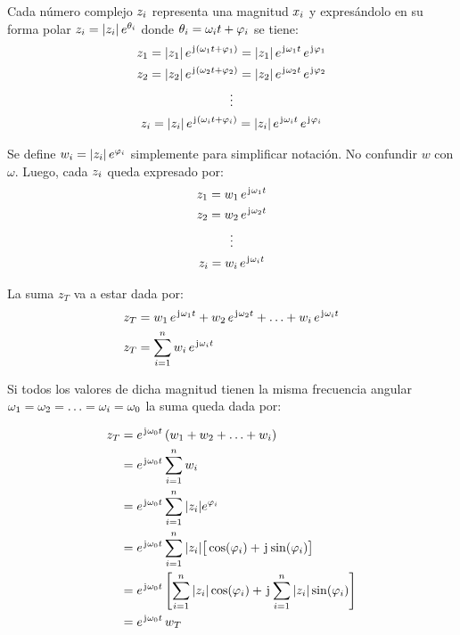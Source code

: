 \documentclass[a5paper,12pt,twoside]{book}
\begin{document}
Cada número complejo $z_i$ representa una magnitud $x_i$ y expresándolo en su forma polar $z_i={\left| {z_i} \right|}\,e^{\theta_i}$ donde $\theta_i=\omega_i t + \varphi_i$ se tiene:
\begin{gather*}
    z_1 = {\left| {z_1} \right|} \, e^{\mkern2mu\mathrm{j}\mkern1mu (\omega_1 t + \varphi_1)} = {\left| {z_1} \right|} \, e^{\mkern2mu\mathrm{j}\mkern1mu \omega_1 t} \, e^{\mkern2mu\mathrm{j}\mkern1mu \varphi_1}
    \\
    z_2 = {\left| {z_2} \right|} \, e^{\mkern2mu\mathrm{j}\mkern1mu (\omega_2 t + \varphi_2)} = {\left| {z_2} \right|} \, e^{\mkern2mu\mathrm{j}\mkern1mu \omega_2 t} \, e^{\mkern2mu\mathrm{j}\mkern1mu \varphi_2}
    \\
    \vdots
    \\
    z_i = {\left| {z_i} \right|} \, e^{\mkern2mu\mathrm{j}\mkern1mu (\omega_i t + \varphi_i)} = {\left| {z_i} \right|} \, e^{\mkern2mu\mathrm{j}\mkern1mu \omega_i t} \, e^{\mkern2mu\mathrm{j}\mkern1mu \varphi_i}
\end{gather*}

Se define $w_i={\left| {z_i} \right|}\,e^{\varphi_i}$ simplemente para simplificar notación.
No confundir $w$ con $\omega$.
Luego, cada $z_i$ queda expresado por:
\begin{gather*}
    z_1 = w_1 \, e^{\mkern2mu\mathrm{j}\mkern1mu \omega_1 t}
    \\
    z_2 = w_2 \, e^{\mkern2mu\mathrm{j}\mkern1mu \omega_2 t}
    \\
    \vdots
    \\
    z_i = w_i \, e^{\mkern2mu\mathrm{j}\mkern1mu \omega_i t}
\end{gather*}

La suma $z_T$ va a estar dada por:
\begin{align*}
    z_T &= w_1 \, e^{\mkern2mu\mathrm{j}\mkern1mu \omega_1 t} + w_2 \, e^{\mkern2mu\mathrm{j}\mkern1mu \omega_2 t} + \ldots + w_i \, e^{\mkern2mu\mathrm{j}\mkern1mu \omega_i t}
    \\
    z_T &= \sum_{i=1}^n w_i \, e^{\mkern2mu\mathrm{j}\mkern1mu \omega_i t}
\end{align*}

Si todos los valores de dicha magnitud tienen la misma frecuencia angular $\omega_1=\omega_2=\ldots=\omega_i=\omega_0$ la suma queda dada por:

\begin{align*}
    z_T &= e^{\mkern2mu\mathrm{j}\mkern1mu \omega_0 t} \left( w_1 + w_2 + \ldots + w_i \right)
    \\
    &=  e^{\mkern2mu\mathrm{j}\mkern1mu \omega_0 t} \sum_{i=1}^n w_i
    \\
    &= e^{\mkern2mu\mathrm{j}\mkern1mu \omega_0 t} \sum_{i=1}^n {\left| {z_i} \right|} e^{\varphi_i}
    \\
    &= e^{\mkern2mu\mathrm{j}\mkern1mu \omega_0 t} \sum_{i=1}^n {\left| {z_i} \right|} \big[ \cos(\varphi_i)+\mkern2mu\mathrm{j}\mkern1mu\sin(\varphi_i) \big]
    \\
    &= e^{\mkern2mu\mathrm{j}\mkern1mu \omega_0 t} \left[ \sum_{i=1}^n {\left| {z_i} \right|} \cos(\varphi_i) + \mkern2mu\mathrm{j}\mkern1mu \sum_{i=1}^n {\left| {z_i} \right|} \sin(\varphi_i) \right]
    \\
    &= e^{\mkern2mu\mathrm{j}\mkern1mu \omega_0 t} \, w_T
\end{align*}
\end{document}
